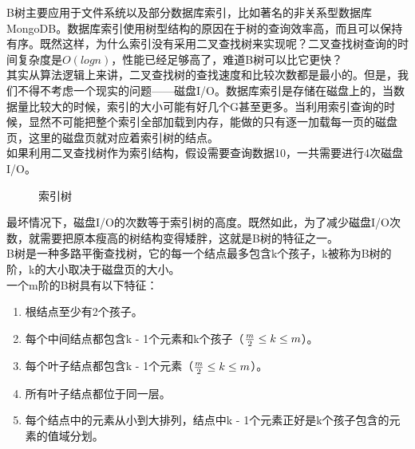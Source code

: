 B树主要应用于文件系统以及部分数据库索引，比如著名的非关系型数据库MongoDB。数据库索引使用树型结构的原因在于树的查询效率高，而且可以保持有序。既然这样，为什么索引没有采用二叉查找树来实现呢？二叉查找树查询的时间复杂度是$ O(logn) $，性能已经足够高了，难道B树可以比它更快？\\

其实从算法逻辑上来讲，二叉查找树的查找速度和比较次数都是最小的。但是，我们不得不考虑一个现实的问题——磁盘I/O。数据库索引是存储在磁盘上的，当数据量比较大的时候，索引的大小可能有好几个G甚至更多。当利用索引查询的时候，显然不可能把整个索引全部加载到内存，能做的只有逐一加载每一页的磁盘页，这里的磁盘页就对应着索引树的结点。\\

如果利用二叉查找树作为索引结构，假设需要查询数据10，一共需要进行4次磁盘I/O。

\begin{figure}[H]
	\centering
	\caption{索引树}
\end{figure}

最坏情况下，磁盘I/O的次数等于索引树的高度。既然如此，为了减少磁盘I/O次数，就需要把原本瘦高的树结构变得矮胖，这就是B树的特征之一。\\

B树是一种多路平衡查找树，它的每一个结点最多包含k个孩子，k被称为B树的阶，k的大小取决于磁盘页的大小。\\

一个m阶的B树具有以下特征：

\begin{enumerate}
	\item 根结点至少有2个孩子。

	\item 每个中间结点都包含k - 1个元素和k个孩子（$ {m \over 2} \le k \le m $）。

	\item 每个叶子结点都包含k - 1个元素（$ {m \over 2} \le k \le m $）。

	\item 所有叶子结点都位于同一层。

	\item 每个结点中的元素从小到大排列，结点中k - 1个元素正好是k个孩子包含的元素的值域分划。
\end{enumerate}

